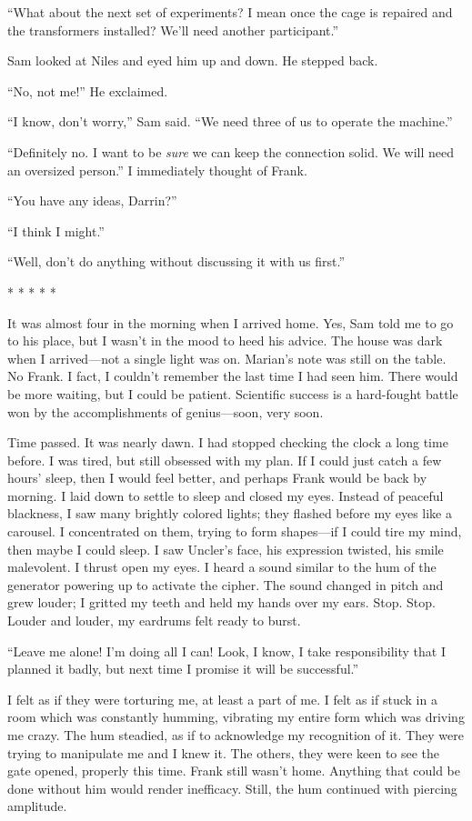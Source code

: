 \documentclass[
]{article}
\begin{document}
``What about the next set of experiments? I mean once the cage is
repaired and the transformers installed? We'll need another
participant.''

Sam looked at Niles and eyed him up and down. He stepped back.

``No, not me!'' He exclaimed.

``I know, don't worry,'' Sam said. ``We need three of us to operate the
machine.''

``Definitely no. I want to be \emph{sure} we can keep the connection
solid. We will need an oversized person.'' I immediately thought of
Frank.

``You have any ideas, Darrin?''

``I think I might.''

``Well, don't do anything without discussing it with us first.''

* * * * *

It was almost four in the morning when I arrived home. Yes, Sam told me
to go to his place, but I wasn't in the mood to heed his advice. The
house was dark when I arrived---not a single light was on. Marian's note
was still on the table. No Frank. I fact, I couldn't remember the last
time I had seen him. There would be more waiting, but I could be
patient. Scientific success is a hard-fought battle won by the
accomplishments of genius---soon, very soon.

Time passed. It was nearly dawn. I had stopped checking the clock a long
time before. I was tired, but still obsessed with my plan. If I could
just catch a few hours' sleep, then I would feel better, and perhaps
Frank would be back by morning. I laid down to settle to sleep and
closed my eyes. Instead of peaceful blackness, I saw many brightly
colored lights; they flashed before my eyes like a carousel. I
concentrated on them, trying to form shapes---if I could tire my mind,
then maybe I could sleep. I saw Uncler's face, his expression twisted,
his smile malevolent. I thrust open my eyes. I heard a sound similar to
the hum of the generator powering up to activate the cipher. The sound
changed in pitch and grew louder; I gritted my teeth and held my hands
over my ears. Stop. Stop. Louder and louder, my eardrums felt ready to
burst.

``Leave me alone! I'm doing all I can! Look, I know, I take
responsibility that I planned it badly, but next time I promise it will
be successful.''

I felt as if they were torturing me, at least a part of me. I felt as if
stuck in a room which was constantly humming, vibrating my entire form
which was driving me crazy. The hum steadied, as if to acknowledge my
recognition of it. They were trying to manipulate me and I knew it. The
others, they were keen to see the gate opened, properly this time. Frank
still wasn't home. Anything that could be done without him would render
inefficacy. Still, the hum continued with piercing amplitude.
\end{document}
